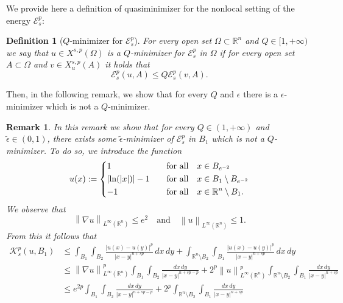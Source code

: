 \documentclass[12pt]{article}
\newcommand{\R}{\mathbb{R}}
\numberwithin{equation}{section}
\newtheorem{defn}[thm]{Definition}
\newtheorem{rem}[thm]{Remark}
\renewcommand{\leq}{\leqslant}
\begin{document}
We provide here a definition of quasiminimizer for the nonlocal setting of the energy $\mathcal{E}_s^p$:
\begin{defn}[$Q$-minimizer for $\mathcal{E}_s^p$]
For every open set $\Omega\subset\R^n$ and $Q\in [1,+\infty)$ we say that $u\in X^{s,p}(\Omega)$ is a $Q$-minimizer for $\mathcal{E}_s^p$ in $\Omega$ if for every open set $A\subset\Omega$ and $v\in X_{u}^{s,p}(A)$ it holds that 
\begin{equation}
\mathcal{E}_s^p(u,A)\leq Q\mathcal{E}_s^p(v,A). 
\end{equation}
\end{defn}
Then, in the following remark, we show that for every $Q$ and $\epsilon$ there is a $\epsilon$-minimizer which is not a $Q$-minimizer.
\begin{rem}
In this remark we show that for every $Q\in (1,+\infty)$ and $\tilde{\epsilon}\in (0,1)$, there exists some $\tilde{\epsilon}$-minimizer of $\mathcal{E}_s^p$ in $B_1$ which is not a $Q$-minimizer. To do so, we introduce the function
\begin{equation}\label{cwbf-86yh}
u(x):=\begin{dcases}
1\quad &\mbox{for all}\quad x\in B_{e^{-2}}\\
\left|\ln(\left|x\right|)\right|-1\quad &\mbox{for all}\quad x\in B_1\setminus B_{e^{-2}}\\
-1\quad &\mbox{for all}\quad x\in \R^n\setminus B_1. 
\end{dcases}
\end{equation} 
We observe that 
\begin{equation}\label{cwbf-86yh}
\left\| \nabla u \right\|_{L^\infty(\R^n)}\leq e^2\quad\mbox{and}\quad \left\|u\right\|_{L^\infty(\R^n)}\leq 1.
\end{equation}
From this it follows that 
\begin{equation}\label{locrebgttt5}
\begin{split}
\mathcal{K}_s^p\left(u,B_{1}\right) &\leq \int_{B_1}\int_{B_2}\frac{\left|u(x)-u(y)\right|^p}{\left|x-y\right|^{n+sp}}\,dx\,dy+\int_{\R^n\setminus B_2}\int_{B_1}\frac{\left|u(x)-u(y)\right|^p}{\left|x-y\right|^{n+sp}}\,dx\,dy\\
&\leq \left\|\nabla u \right\|_{L^\infty(\R^n)}^p \int_{B_1}\int_{B_2}\frac{dx\,dy}{\left|x-y\right|^{n+sp-p}}+2^p\left\|u\right\|_{L^\infty(\R^n)}^p\int_{\R^n\setminus B_2}\int_{B_1} \frac{dx\,dy}{\left|x-y\right|^{n+sp}} \\
&\leq e^{2p} \int_{B_1}\int_{B_2}\frac{dx\,dy}{\left|x-y\right|^{n+sp-p}}+2^p\int_{\R^n\setminus B_2}\int_{B_1} \frac{dx\,dy}{\left|x-y\right|^{n+sp}} \\

\end{split}
\end{equation}
\end{rem}
\end{document}
